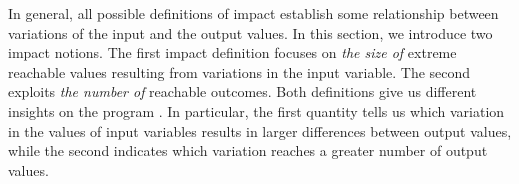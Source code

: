 In general, all possible definitions of impact establish some relationship between variations of the input and the output values.
In this section, we introduce two impact notions.
The first impact definition focuses on \textit{the size of} extreme reachable values resulting from variations in the input variable.
The second exploits \textit{the number of} reachable outcomes.
Both definitions give us different insights on the program \landingprogram.
In particular, the first quantity tells us which variation in the values of input variables results in larger differences between output values, while the second indicates which variation reaches a greater number of output values.

\newcommand*{\highlight}[1]{\textcolor{seabornBlue}{#1}}
\newcommand*{\inputa}{\tuple{-4}{1}}
\newcommand*{\inputax}{\tuple{\highlight{-4}}{1}}
\newcommand*{\inputay}{\tuple{-4}{\highlight{1}}}
\newcommand*{\outputa}{\langle \outputvaluea\rangle} \newcommand*{\outputvaluea}{3}
\newcommand*{\inputb}{\tuple{-4}{2}}
\newcommand*{\inputbx}{\tuple{\highlight{-4}}{2}}
\newcommand*{\inputby}{\tuple{-4}{\highlight{2}}}
\newcommand*{\outputb}{\langle \outputvalueb\rangle} \newcommand*{\outputvalueb}{3}
\newcommand*{\inputc}{\tuple{-4}{3}}
\newcommand*{\inputcx}{\tuple{\highlight{-4}}{3}}
\newcommand*{\inputcy}{\tuple{-4}{\highlight{3}}}
\newcommand*{\outputc}{\langle \outputvaluec\rangle} \newcommand*{\outputvaluec}{3}
\newcommand*{\inputd}{\tuple{ 1}{1}}
\newcommand*{\inputdx}{\tuple{\highlight{ 1}}{1}}
\newcommand*{\inputdy}{\tuple{ 1}{\highlight{1}}}
\newcommand*{\outputd}{\langle \outputvalued\rangle} \newcommand*{\outputvalued}{0}
\newcommand*{\inpute}{\tuple{ 1}{2}}
\newcommand*{\inputex}{\tuple{\highlight{ 1}}{2}}
\newcommand*{\inputey}{\tuple{ 1}{\highlight{2}}}
\newcommand*{\outpute}{\langle \outputvaluee\rangle} \newcommand*{\outputvaluee}{1}
\newcommand*{\inputf}{\tuple{ 1}{3}}
\newcommand*{\inputfx}{\tuple{\highlight{ 1}}{3}}
\newcommand*{\inputfy}{\tuple{ 1}{\highlight{3}}}
\newcommand*{\outputf}{\langle \outputvaluef\rangle} \newcommand*{\outputvaluef}{2}
\newcommand*{\tracea}{\inputa\to\outputa}
\newcommand*{\traceax}{\inputax\to\outputa}
\newcommand*{\traceay}{\inputay\to\outputa}
\newcommand*{\traceb}{\inputb\to\outputb}
\newcommand*{\tracebx}{\inputbx\to\outputb}
\newcommand*{\traceby}{\inputby\to\outputb}
\newcommand*{\tracec}{\inputc\to\outputc}
\newcommand*{\tracecx}{\inputcx\to\outputc}
\newcommand*{\tracecy}{\inputcy\to\outputc}
\newcommand*{\traced}{\inputd\to\outputd}
\newcommand*{\tracedx}{\inputdx\to\outputd}
\newcommand*{\tracedy}{\inputdy\to\outputd}
\newcommand*{\tracee}{\inpute\to\outpute}
\newcommand*{\traceex}{\inputex\to\outpute}
\newcommand*{\traceey}{\inputey\to\outpute}
\newcommand*{\tracef}{\inputf\to\outputf}
\newcommand*{\tracefx}{\inputfx\to\outputf}
\newcommand*{\tracefy}{\inputfy\to\outputf}

